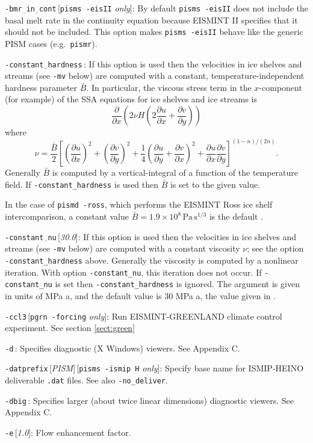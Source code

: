 \documentclass[11pt,final]{amsart}
\newcommand{\ddx}[1]{\ensuremath{\frac{\partial #1}{\partial x}}}
\newcommand{\ddy}[1]{\ensuremath{\frac{\partial #1}{\partial y}}}
\newcommand{\rawopt}[1]{\vspace{1mm}\noindent \large\texttt{-#1}\normalsize}
\newcommand{\opt}[1]{\rawopt{#1}\,:\quad}
\newcommand{\optdef}[2]{\rawopt{#1}\,[\textsl{#2}]:\quad}
\newcommand{\optrestrict}[2]{\rawopt{#1}\,[\texttt{#2} \textsl{only}]:\quad}
\newcommand{\optdefrestrict}[3]{\rawopt{#1}\,[\textsl{#2}]\,[\texttt{#3} \textsl{only}]:\quad}
\newcommand{\und}{$\underline{\,\,\,}$}
\begin{document}
\optrestrict{bmr\und in\und cont}{pisms -eisII}  By default \verb|pisms -eisII| does not include the basal melt rate in the continuity equation because EISMINT II specifies that it should not be included.  This option makes \verb|pisms -eisII| behave like the generic PISM cases (e.g.~\verb|pismr|).

\opt{constant\und hardness}  If this option is used then the velocities in ice shelves and streams (see \verb|-mv| below) are computed with a constant, temperature-independent hardness parameter $\bar B$.  In particular, the viscous stress term in the $x$-component (for example) of the SSA equations for ice shelves and ice streams is
	$$\ddx{}\left(2\nu H\left(2\ddx{u} + \ddy{v}\right)\right)$$
where 
	$$\nu = \frac{\bar B}{2} \left[\left(\ddx{u}\right)^2 + \left(\ddy{v}\right)^2 +
  \frac{1}{4} \left(\ddy{u} + \ddx{v}\right)^2 + \ddx{u}\ddy{v}\right]^{(1-n)/(2n)}.$$
Generally $\bar B$ is computed by a vertical-integral of a function of the temperature field.  If \verb|-constant_hardness| is used then $\bar B$ is set to the given value.

In the case of \verb|pismd -ross|, which performs the EISMINT Ross ice shelf intercomparison, a constant value $\bar B = 1.9 \times 10^8 \, \text{Pa}\, \text{s}^{1/3}$ is the default \cite{MacAyealetal}.

\optdef{constant\und nu}{30.0}  If this option is used then the velocities in ice shelves and streams (see \verb|-mv| below) are computed with a constant viscosity $\nu$; see the option \verb|-constant_hardness| above.  Generally the viscosity is computed by a nonlinear iteration.  With option \verb|-constant_nu|, this iteration does not occur.  If \verb|-constant_nu| is set then \verb|-constant_hardness| is ignored.  The argument is given in units of MPa a, and the default value is $30$ MPa a, the value given in \cite{Ritzetal2001}.

\optrestrict{ccl3}{pgrn -forcing}    Run EISMINT-GREENLAND climate control experiment. See section \ref{sect:green}

\opt{d}  Specifies diagnostic (X Windows) viewers.  See Appendix C.

\optdefrestrict{datprefix}{PISM}{pisms -ismip H}  Specify base name for ISMIP-HEINO deliverable \verb|.dat| files.  See also \verb|-no_deliver|.

\opt{dbig}  Specifies larger (about twice linear dimensions) diagnostic viewers.  See Appendix C.

\optdef{e}{1.0}  Flow enhancement factor.
\end{document}
